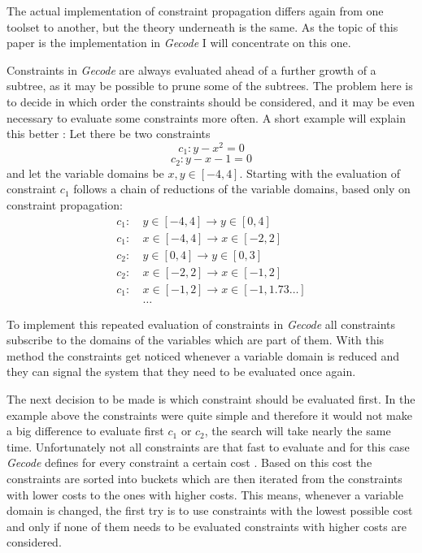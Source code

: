 \documentclass[10pt,
               a4paper,
               journal,
               ]{IEEEtran}
\begin{document}
	The actual implementation of constraint propagation differs again from one toolset to another, but the theory underneath is the same. As the topic of this paper is the implementation in \emph{Gecode} I will concentrate on this one.
	
	Constraints in \emph{Gecode} are always evaluated ahead of a further growth of a subtree, as it may be possible to prune some of the subtrees. The problem here is to decide in which order the constraints should be considered, and it may be even necessary to evaluate some constraints more often. A short example will explain this better \cite[p.~575]{handbookCP}: Let there be two constraints 
	\begin{equation}
		c_1: y - x^2 = 0
	\end{equation}
	\begin{equation}
		c_2: y - x - 1 = 0
		\label{eq:linear}
	\end{equation}
	and let the variable domains be $x, y \in [-4, 4]$. Starting with the evaluation of constraint $c_1$ follows a chain of reductions of the variable domains, based only on constraint propagation:
	\begin{equation}
	\begin{split}
		c_1:\ &y \in [-4, 4] \rightarrow y \in [0, 4] \\
		c_1:\ &x \in [-4, 4] \rightarrow x \in [-2, 2] \\
		c_2:\ &y \in [0, 4] \rightarrow y \in [0, 3] \\
		c_2:\ &x \in [-2, 2] \rightarrow x \in [-1, 2] \\
		c_1:\ &x \in [-1, 2] \rightarrow x \in [-1, 1.73 \dots] \\
		&\dots
	\end{split}
	\end{equation}
	
	To implement this repeated evaluation of constraints in \emph{Gecode} all constraints subscribe to the domains of the variables which are part of them. With this method the constraints get noticed whenever a variable domain is reduced and they can signal the system that they need to be evaluated once again.
	
	The next decision to be made is which constraint should be evaluated first. In the example above the constraints were quite simple and therefore it would not make a big difference to evaluate first $c_1$ or $c_2$, the search will take nearly the same time. Unfortunately not all constraints are that fast to evaluate and for this case \emph{Gecode} defines for every constraint a certain cost \cite[p.~275]{programmingGecode}. Based on this cost the constraints are sorted into buckets which are then iterated from the constraints with lower costs to the ones with higher costs. This means, whenever a variable domain is changed, the first try is to use constraints with the lowest possible cost and only if none of them needs to be evaluated constraints with higher costs are considered.
	
\end{document}
